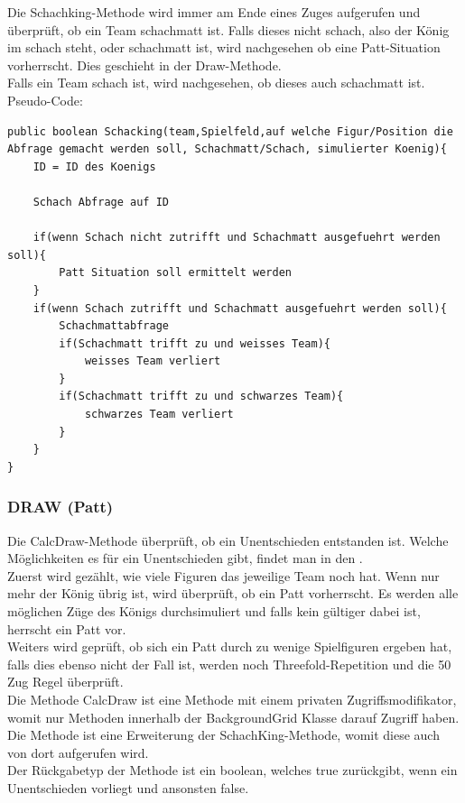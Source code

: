 \documentclass[12pt,a4paper]{article}
\begin{document}
Die Schachking-Methode wird immer am Ende eines Zuges aufgerufen und überprüft, ob ein Team schachmatt ist. Falls dieses nicht schach, also der König im schach steht, oder schachmatt ist, wird nachgesehen ob eine Patt-Situation vorherrscht. Dies geschieht in der Draw-Methode. \\
Falls ein Team schach ist, wird nachgesehen, ob dieses auch schachmatt ist. \\
Pseudo-Code:

\lstset{language=Java}
\begin{lstlisting}
public boolean Schacking(team,Spielfeld,auf welche Figur/Position die Abfrage gemacht werden soll, Schachmatt/Schach, simulierter Koenig){
	ID = ID des Koenigs
	
	Schach Abfrage auf ID
	
	if(wenn Schach nicht zutrifft und Schachmatt ausgefuehrt werden soll){
		Patt Situation soll ermittelt werden
	}
	if(wenn Schach zutrifft und Schachmatt ausgefuehrt werden soll){
		Schachmattabfrage
		if(Schachmatt trifft zu und weisses Team){
			weisses Team verliert
		}	
		if(Schachmatt trifft zu und schwarzes Team){
			schwarzes Team verliert
		}
	}
}
\end{lstlisting}

\subsubsection{DRAW (Patt)}
\label{SUBSUBSEC:draw}

Die CalcDraw-Methode überprüft, ob ein Unentschieden entstanden ist. Welche Möglichkeiten es für ein Unentschieden gibt, findet man in den . \\
Zuerst wird gezählt, wie viele Figuren das jeweilige Team noch hat. Wenn nur mehr der König übrig ist, wird überprüft, ob ein Patt vorherrscht. Es werden alle möglichen Züge des Königs durchsimuliert und falls kein gültiger dabei ist, herrscht ein Patt vor. \\
Weiters wird geprüft, ob sich ein Patt durch zu wenige Spielfiguren ergeben hat, falls dies ebenso nicht der Fall ist, werden noch Threefold-Repetition und die 50 Zug Regel überprüft. \\[2ex]
Die Methode CalcDraw ist eine Methode mit einem privaten Zugriffsmodifikator, womit nur Methoden innerhalb der BackgroundGrid Klasse darauf Zugriff haben. Die Methode ist eine Erweiterung der SchachKing-Methode, womit diese auch von dort aufgerufen wird. \\
Der Rückgabetyp der Methode ist ein boolean, welches true zurückgibt, wenn ein Unentschieden vorliegt und ansonsten false.
\end{document}
